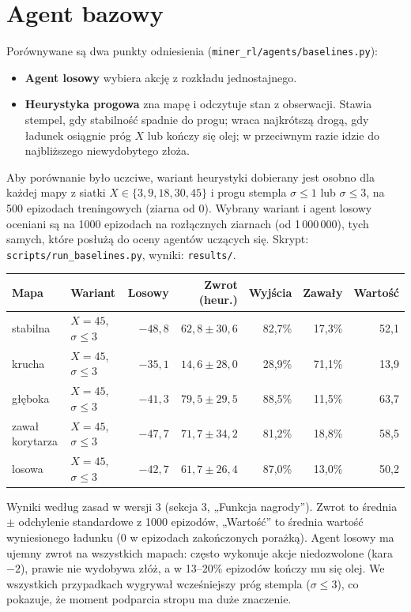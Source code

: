 \documentclass[11pt,a4paper]{article}
\begin{document}
\section{Agent bazowy}\label{sec:baseline}
Porównywane są dwa punkty odniesienia (\texttt{miner\_rl/agents/baselines.py}):
\begin{itemize}
  \item \textbf{Agent losowy} wybiera akcję z rozkładu jednostajnego.
  \item \textbf{Heurystyka progowa} zna mapę i odczytuje stan z obserwacji.
  Stawia stempel, gdy stabilność spadnie do progu; wraca najkrótszą drogą, gdy
  ładunek osiągnie próg $X$ lub kończy się olej; w przeciwnym razie idzie do
  najbliższego niewydobytego złoża.
\end{itemize}
Aby porównanie było uczciwe, wariant heurystyki dobierany jest osobno dla każdej
mapy z siatki $X \in \{3, 9, 18, 30, 45\}$ i progu stempla $\sigma \le 1$ lub
$\sigma \le 3$, na 500 epizodach treningowych (ziarna od 0). Wybrany wariant
i agent losowy oceniani są na 1000 epizodach na rozłącznych ziarnach (od
1\,000\,000), tych samych, które posłużą do oceny agentów uczących się.
Skrypt: \texttt{scripts/run\_baselines.py}, wyniki: \texttt{results/}.

\begin{center}
\small
\begin{tabular}{@{}llrrrrr@{}}
\toprule
Mapa & Wariant & Losowy & Zwrot (heur.) & Wyjścia & Zawały & Wartość \\
\midrule
stabilna & $X=45$, $\sigma\le3$ & $-48{,}8$ & $62{,}8 \pm 30{,}6$ & 82,7\% & 17,3\% & 52,1 \\
krucha & $X=45$, $\sigma\le3$ & $-35{,}1$ & $14{,}6 \pm 28{,}0$ & 28,9\% & 71,1\% & 13,9 \\
głęboka & $X=45$, $\sigma\le3$ & $-41{,}3$ & $79{,}5 \pm 29{,}5$ & 88,5\% & 11,5\% & 63,7 \\
zawał korytarza & $X=45$, $\sigma\le3$ & $-47{,}7$ & $71{,}7 \pm 34{,}2$ & 81,2\% & 18,8\% & 58,5 \\
losowa & $X=45$, $\sigma\le3$ & $-42{,}7$ & $61{,}7 \pm 26{,}4$ & 87,0\% & 13,0\% & 50,2 \\
\bottomrule
\end{tabular}
\end{center}
Wyniki według zasad w wersji 3 (sekcja 3, „Funkcja nagrody”). Zwrot to średnia
$\pm$ odchylenie standardowe z 1000 epizodów, „Wartość” to średnia wartość
wyniesionego ładunku (0 w epizodach zakończonych porażką). Agent losowy ma ujemny
zwrot na wszystkich mapach: często wykonuje akcje niedozwolone (kara $-2$), prawie
nie wydobywa złóż, a w 13--20\% epizodów kończy mu się olej. We wszystkich
przypadkach wygrywał wcześniejszy próg stempla ($\sigma\le3$), co pokazuje, że
moment podparcia stropu ma duże znaczenie.
\end{document}
